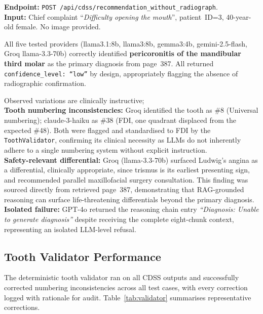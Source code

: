 \documentclass[12pt,a4paper]{report}
\begin{document}
\textbf{Endpoint:} \texttt{POST /api/cdss/recommendation\_without\_radiograph}. \\
\textbf{Input:} Chief complaint ``\emph{Difficulty opening the mouth}'', patient~ID=3,
40-year-old female. No image provided.

All five tested providers (llama3.1:8b, llama3:8b, gemma3:4b, gemini-2.5-flash,
Groq llama-3.3-70b) correctly identified \textbf{pericoronitis of the mandibular
third molar} as the primary diagnosis from page~387. All returned
\texttt{confidence\_level: ``low''} by design, appropriately flagging the absence
of radiographic confirmation.

Observed variations are clinically instructive; \\
\textbf{Tooth numbering
inconsistencies:} Groq identified the tooth as \#8 (Universal numbering);
claude-3-haiku as \#38 (FDI, one quadrant displaced from the expected \#48).
Both were flagged and standardised to FDI by the \texttt{ToothValidator},
confirming its clinical necessity as LLMs do not inherently adhere to a single
numbering system without explicit instruction. \\
\textbf{Safety-relevant
differential:} Groq (llama-3.3-70b) surfaced Ludwig's angina as a
differential, clinically appropriate, since trismus is its earliest presenting
sign, and recommended parallel maxillofacial surgery consultation. This
finding was sourced directly from retrieved page~387, demonstrating that
RAG-grounded reasoning can surface life-threatening differentials beyond the
primary diagnosis.\\
\textbf{Isolated failure:} GPT-4o returned the reasoning
chain entry \textit{``Diagnosis: Unable to generate diagnosis''} despite
receiving the complete eight-chunk context, representing an isolated LLM-level
refusal.




\subsection{Tooth Validator Performance}

The deterministic tooth validator ran on all CDSS outputs and successfully
corrected numbering inconsistencies across all test cases, with every correction
logged with rationale for audit. Table~\ref{tab:validator} summarises
representative corrections.
\end{document}
